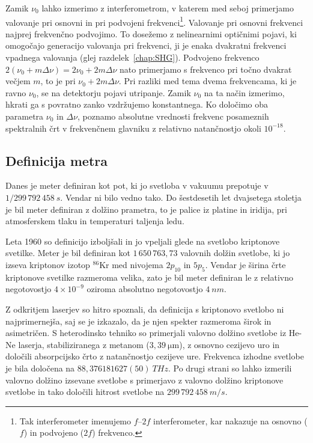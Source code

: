 Zamik $\nu_0$ lahko izmerimo
z interferometrom, v katerem med seboj primerjamo valovanje pri 
osnovni in pri podvojeni frekvenci\footnote{Tak interferometer imenujemo $f$--$2f$
interferometer, kar nakazuje na osnovno ($f$)  in podvojeno ($2f$) frekvenco.}.
Valovanje pri osnovni frekvenci najprej frekvenčno podvojimo. To dosežemo 
z nelinearnimi optičnimi pojavi, ki omogočajo generacijo valovanja pri frekvenci, 
ji je enaka dvakratni frekvenci vpadnega valovanja 
(glej razdelek~\ref{chap:SHG}). Podvojeno frekvenco $2(\nu_0 + 
m\Delta \nu)= 2\nu_0 + 2m\Delta \nu$ nato primerjamo s frekvenco pri 
točno dvakrat večjem $m$, to je pri $\nu_0 + 2m\Delta \nu$. Pri razliki med tema
dvema frekvencama, ki je ravno $\nu_0$, se na detektorju pojavi utripanje.
Zamik $\nu_0$ na ta način izmerimo, hkrati ga s povratno zanko
vzdržujemo konstantnega. Ko določimo oba parametra $\nu_0$ in $\Delta \nu$, 
poznamo absolutne vrednosti frekvenc posameznih spektralnih črt v frekvenčnem 
glavniku z relativno natančnostjo okoli $10^{-18}$.

\subsection*{Definicija metra}
Danes je meter definiran kot pot, ki jo svetloba v vakuumu prepotuje v 
$1/299\,792\,458~\si{s}$.  Vendar ni bilo vedno tako. Do šestdesetih let dvajsetega
stoletja je bil meter definiran z dolžino prametra, to je palice iz platine in iridija, 
pri atmosferskem tlaku in temperaturi taljenja ledu. 

Leta 1960 so definicijo 
izboljšali in jo vpeljali glede na svetlobo kriptonove svetilke. Meter je bil 
definiran kot $1\,650\, 763,73$ valovnih dolžin svetlobe, ki jo izseva kriptonov
izotop $^{86}$Kr med nivojema $2p_{10}$ in $5p_5$. Vendar je širina črte
kriptonove svetilke razmeroma velika, zato je bil meter 
definiran le z relativno negotovostjo $4 \times 10^{-9}$ oziroma absolutno 
negotovostjo $4~\si{nm}$. 

Z odkritjem laserjev so hitro spoznali, da definicija s kriptonovo svetlobo ni 
najprimernejša, saj se je izkazalo, da je njen spekter razmeroma širok in asimetričen. 
S heterodinsko tehniko so primerjali valovno dolžino 
svetlobe 
iz He-Ne laserja, stabiliziranega z metanom ($3,39~\si{\micro\meter}$), z osnovno
cezijevo uro in določili absorpcijsko črto z natančnostjo cezijeve ure.
Frekvenca izhodne svetlobe je bila določena na $88,376181627(50)~\si{THz}$.
Po drugi strani so lahko izmerili valovno dolžino izsevane svetlobe s primerjavo 
z valovno dolžino kriptonove svetlobe in tako določili hitrost svetlobe na
$299\, 792\, 458~\si{m/s}$.

